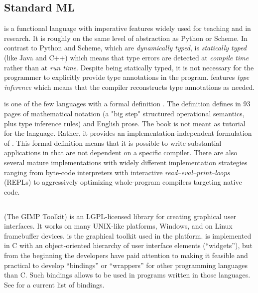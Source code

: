\documentclass[workingdraft]{usetex-v1}
\begin{document}
\subsection{Standard ML}


\sml is a functional language with imperative features
widely used for teaching and in research.  It is roughly on the same
level of abstraction as Python or Scheme. In contrast to Python and
Scheme, which are \emph{dynamically typed}, \sml is \emph{statically
  typed} (like Java and C++) which means that type errors are detected
at \emph{compile time} rather than at \emph{run time}.  Despite \sml
being statically typed, it is not necessary for the programmer to
explicitly provide type annotations in the program. \sml features
\emph{type inference} which means that the compiler reconstructs type
annotations as needed.

\sml is one of the few languages with a formal definition
\cite{Milner:1997:Definition}.  The definition defines \sml in 93
pages of mathematical notation (a "big step" structured operational
semantics, plus type inference rules) and English prose.  The book is
not meant as tutorial for the language. Rather, it provides an
implementation-independent formulation of \sml.  This formal
definition means that it is possible to write substantial applications
in \sml that are not dependent on a specific compiler.  There are also
several mature \sml implementations with widely different
implementation strategies ranging from byte-code interpreters with
interactive \emph{read--eval--print--loops} (REPLs) to aggressively
optimizing whole-program compilers targeting native code.




\subsection{\gtk}
\label{sec:gtk}


\gtk (The GIMP Toolkit) \cite{Gtk-webpage:2004} is an LGPL-licensed
\cite{LGPL:1999} library for creating graphical
user interfaces.  It works on many UNIX-like platforms, Windows, and
on Linux framebuffer devices.  \gtk is the graphical toolkit used in
the \gnome platform. \gtk is implemented in C with an object-oriented
hierarchy of user interface elements (``widgets''), but from the beginning
the \gtk developers have paid attention to making it feasible and
practical to develop ``bindings'' or ``wrappers'' for
other programming languages than C.  Such bindings allows \gtk to be
used in programs written in those languages. See
\cite{Gtk-bindings-webpage:2004} for a current list of bindings.
\end{document}
